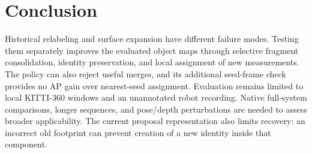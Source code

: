 \section{Conclusion}
Historical relabeling and surface expansion have different failure modes. Testing them separately improves the evaluated object maps through selective fragment consolidation, identity preservation, and local assignment of new measurements. The policy can also reject useful merges, and its additional seed-frame check provides no AP gain over nearest-seed assignment. Evaluation remains limited to local KITTI-360 windows and an unannotated robot recording. Native full-system comparisons, longer sequences, and pose/depth perturbations are needed to assess broader applicability. The current proposal representation also limits recovery: an incorrect old footprint can prevent creation of a new identity inside that component.

\balance
\begingroup
\small
\setlength{\bibsep}{1pt}


\endgroup
